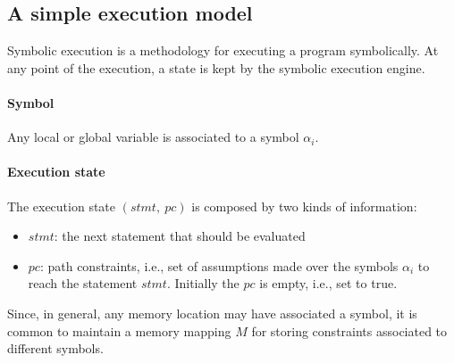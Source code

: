 \documentclass[10pt, a4paper]{article}
\begin{document}
\subsection{A simple execution model}
\label{simple-execution-model}

Symbolic execution is a methodology for executing a program symbolically. At any point of the execution, a state is kept by the symbolic execution engine.

\paragraph{Symbol} Any local or global variable is associated to a symbol $\alpha_i$. 
\paragraph{Execution state} The execution state $(stmt,~pc)$ is composed by two kinds of information:
\begin{itemize}
  \item $stmt$: the next statement that should be evaluated
  \item $pc$: path constraints, i.e., set of assumptions made over the symbols $\alpha_i$ to reach the statement $stmt$. Initially the $pc$ is empty, i.e., set to true.
\end{itemize}
Since, in general, any memory location may have associated a symbol, it is common to maintain a memory mapping $M$ for storing constraints associated to different symbols.
\end{document}
